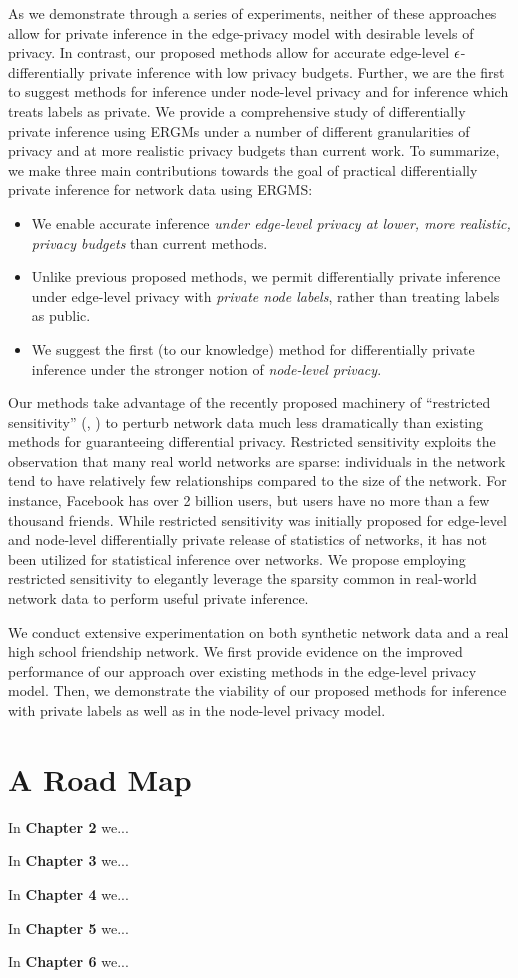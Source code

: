 As we demonstrate through a series of experiments, neither of these approaches allow for private inference in the edge-privacy model with desirable levels of privacy. In contrast, our proposed methods allow for accurate edge-level $\epsilon$-differentially private inference with low privacy budgets. Further, we are the first to suggest methods for inference under node-level privacy and for inference which treats labels as private. We provide a comprehensive study of differentially private inference using ERGMs under a number of different granularities of privacy and at more realistic privacy budgets than current work. To summarize, we make three main contributions towards the goal of practical differentially private inference for network data using ERGMS:
\begin{itemize}
	\item We enable accurate inference \emph{under edge-level privacy at lower, more realistic, privacy budgets} than current methods.
	\item Unlike previous proposed methods, we permit differentially private inference under edge-level privacy with \emph{private node labels}, rather than treating labels as public.
	\item We suggest the first (to our knowledge) method for differentially private inference under the stronger notion of \emph{node-level privacy}.
\end{itemize}

Our methods take advantage of the recently proposed machinery of ``restricted sensitivity'' (\cite{BBDS13}, \cite{KNRS13}) to perturb network data much less dramatically than existing methods for guaranteeing differential privacy. Restricted sensitivity exploits the observation that many real world networks are sparse: individuals in the network tend to have relatively few relationships compared to the size of the network. For instance, Facebook has over 2 billion users, but users have no more than a few thousand friends. While restricted sensitivity was initially proposed for edge-level and node-level differentially private release of statistics of networks, it has not been utilized for statistical inference over networks. We propose employing restricted sensitivity to elegantly leverage the sparsity common in real-world network data to perform useful private inference. 

We conduct extensive experimentation on both synthetic network data and a real high school friendship network. We first provide evidence on the improved performance of our approach over existing methods in the edge-level privacy model. Then, we demonstrate the viability of our proposed methods for inference with private labels as well as in the node-level privacy model.
 
\section{A Road Map}

In \textbf{Chapter 2} we...

In \textbf{Chapter 3} we...

In \textbf{Chapter 4} we...

In \textbf{Chapter 5} we...

In \textbf{Chapter 6} we...